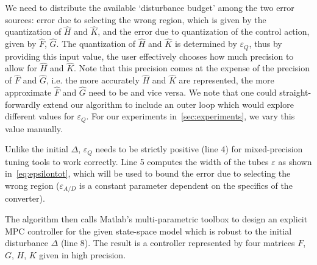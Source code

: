 We need to distribute the available `disturbance budget' among the two error
sources: error due to selecting the wrong region, which is given by the
quantization of $\hat{H}$ and $\hat{K}$, and the error due to
quantization of the control action, given by $\hat{F}$, $\hat{G}$.
The quantization of $\hat{H}$ and $\hat{K}$ is determined by
$\varepsilon_Q$, thus by providing this input value, the user effectively
chooses how much precision to allow for $\hat{H}$ and $\hat{K}$.
Note that this precision comes at the expense of the precision of
$\hat{F}$ and $\hat{G}$, i.e. the more accurately $\hat{H}$
and $\hat{K}$ are represented, the more approximate $\hat{F}$ and
$\hat{G}$ need to be and vice versa.
We note that one could straight-forwardly extend our algorithm to include an
outer loop which would explore different values for $\varepsilon_Q$. For our
experiments in~\autoref{sec:experiments}, we vary this value manually.



Unlike the initial $\Delta$, $\varepsilon_Q$ needs to be strictly positive (line 4)
for mixed-precision tuning tools to work correctly. 
Line 5 computes the width of the tubes $\varepsilon$ as shown in~\autoref{eq:epsilontot},
which will be used to bound the error due to selecting the wrong region
($\varepsilon_{A/D}$ is a constant parameter dependent on the specifics of the
converter).

The algorithm then calls Matlab's multi-parametric toolbox to design an explicit
MPC controller for the given state-space model which is robust to the initial
disturbance $\Delta$ (line 8). The result is a controller represented by four matrices
$F$, $G$, $H$, $K$ given in high precision.

